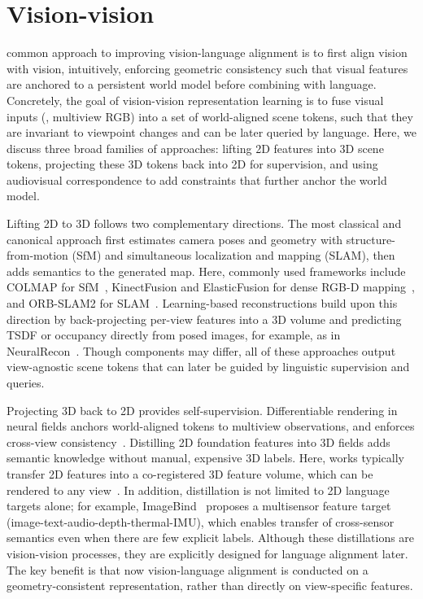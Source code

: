 \section{Vision-vision}
\label{cross_modality_vision_vision}
 common approach to improving vision-language alignment is to first align vision with vision, intuitively, enforcing geometric consistency such that visual features are anchored to a persistent world model before combining with language.
Concretely, the goal of vision-vision representation learning is to fuse visual inputs (\eg, multiview RGB) into a set of world-aligned scene tokens, such that they are invariant to viewpoint changes and can be later queried by language. 
Here, we discuss three broad families of approaches: lifting 2D features into 3D scene tokens, projecting these 3D tokens back into 2D for supervision, and using audiovisual correspondence to add constraints that further anchor the world model.

Lifting 2D to 3D follows two complementary directions. The most classical and canonical approach first estimates camera poses and geometry with structure-from-motion (SfM) and simultaneous localization and mapping (SLAM), then adds semantics to the generated map. 
Here, commonly used frameworks include COLMAP for SfM~\cite{schonberger2016structure}, KinectFusion and ElasticFusion for dense RGB-D mapping~\cite{newcombe2011kinectfusion,  whelan2015elasticfusion}, and ORB-SLAM2 for SLAM~\cite{mur2017orb}. 
Learning-based reconstructions build upon this direction by back-projecting per-view features into a 3D volume and predicting TSDF or occupancy directly from posed images, for example, as in NeuralRecon~\cite{sun2021neuralrecon}. 
Though components may differ, all of these approaches output view-agnostic scene tokens that can later be guided by linguistic supervision and queries.

Projecting 3D back to 2D provides self-supervision. Differentiable rendering in neural fields anchors world-aligned tokens to multiview observations, and enforces cross-view consistency~\cite{mildenhall2021nerf}. 
Distilling 2D foundation features into 3D fields adds semantic knowledge without manual, expensive 3D labels. Here, works typically transfer 2D features into a co-registered 3D feature volume, which can be rendered to any view~\cite{shen2023distilled, ye2023featurenerf}. 
In addition, distillation is not limited to 2D language targets alone; for example, ImageBind~\cite{girdhar2023imagebind} proposes a multisensor feature target (image-text-audio-depth-thermal-IMU), which enables transfer of cross-sensor semantics even when there are few explicit labels. 
Although these distillations are vision-vision processes, they are explicitly designed for language alignment later. The key benefit is that now vision-language alignment is conducted on a geometry-consistent representation, rather than directly on view-specific features.

